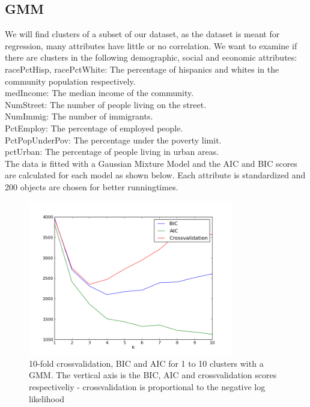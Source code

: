 \documentclass[a4paper,10pt]{article}
\begin{document}
\subsection{GMM}
We will find clusters of a subset of our dataset, as the dataset is meant for regression, many attributes have little or no correlation. We want to examine if there are clusters in the following demographic, social and economic attributes:\\
racePctHisp, racePctWhite: The percentage of hispanics and whites in the community population respectively.\\
medIncome: The median income of the community.\\
NumStreet: The number of people living on the street.\\
NumImmig: The number of immigrants.\\
PctEmploy: The percentage of employed people.\\
PctPopUnderPov: The percentage under the poverty limit.\\
pctUrban: The percentage of people living in urban areas.\\

The data is fitted with a Gaussian Mixture Model and the AIC and BIC scores are calculated for each model as shown below. Each attribute is standardized and 200 objects are chosen for better runningtimes. 

\begin{figure}[H]
\centering
\includegraphics[h, width=0.8\textwidth]{figure_1}
\caption{10-fold crossvalidation, BIC and AIC for 1 to 10 clusters with a GMM. The vertical axis is the BIC, AIC and crossvalidation scores respectiveliy - crossvalidation is proportional to the negative log likelihood}
\end{figure}
\end{document}
